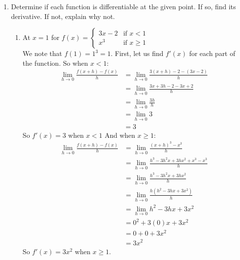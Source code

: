 \documentclass[12pt,letterpaper]{article}
\theoremstyle{case}
\theoremstyle{definition}
\begin{document}
\begin{enumerate}
\begin{enumerate}
		\end{enumerate}
		\item Determine if each function is differentiable at the given point. If so, find its derivative. If not, explain why not.
		\begin{enumerate}
			\item At $x=1$ for $f(x)=\begin{cases}
				3x-2 &\text{if } x<1 \\
				x^3 &\text{if } x \geq 1
			\end{cases}$\\
			
			We note that $f(1)=1^3=1$. First, let us find $f'(x)$ for each part of the function. So when $x<1$:
			\begin{align*}
				\lim\limits_{h \to 0} \frac{f(x+h)-f(x)}{h} &= \lim\limits_{h \to 0} \frac{3(x+h)-2-(3x-2)}{h} \\
				&= \lim\limits_{h \to 0} \frac{3x+3h-2-3x+2}{h} \\
				&= \lim\limits_{h \to 0} \frac{3h}{h} \\
				&= \lim\limits_{h \to 0} 3 \\
				&= 3
			\end{align*}
			So $f'(x)=3$ when $x <1$
			And when $x \geq 1$:
			\begin{align*}
				\lim\limits_{h \to 0} \frac{f(x+h)-f(x)}{h} &= \lim\limits_{h \to 0} \frac{(x+h)^3-x^3}{h} \\
				&= \lim\limits_{h \to 0} \frac{h^3-3h^2x+3hx^2+x^3-x^3}{h} \\
				&= \lim\limits_{h \to 0} \frac{h^3-3h^2x+3hx^2}{h} \\
				&= \lim\limits_{h \to 0} \frac{h(h^2-3hx+3x^2)}{h} \\
				&= \lim\limits_{h \to 0} h^2-3hx+3x^2 \\
				&= 0^2+3(0)x+3x^2 \\
				&= 0+0+3x^2 \\
				&= 3x^2
			\end{align*}
			So $f'(x)=3x^2$ when $x \geq 1$.\\
			

\end{enumerate}
\end{enumerate}
\end{document}
